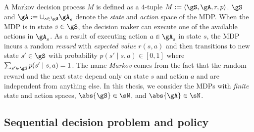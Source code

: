 A Markov decision process $M$ is defined as a $4$-tuple $M:=\langle\gS, \gA, r, p\rangle$.
$\gS$ and $\gA:=\cup_{s\in\gS}\gA_s$ denote the \emph{state} and \emph{action} space of the MDP.
When the MDP is in state $s\in\gS$, the decision maker can execute one of the available actions in $\gA_s$.
As a result of executing action $a\in\gA_s$ in state $s$, the MDP incurs a random \emph{reward} with \emph{expected value} $r(s,a)$ and then transitions to new state $s'\in\gS$ with probability $p(s'\mid s, a)\in[0,1]$ where $\sum_{s'\in\gS}p(s'\mid s,a)=1$.
The name \emph{Markov} comes from the fact that the random reward and the next state depend only on state $s$ and action $a$ and are independent from anything else.
In this thesis, we consider the MDPs with \emph{finite} state and action spaces, $\abs{\gS}\in\sN$, and $\abs{\gA}\in\sN$.


\subsection{Sequential decision problem and policy}

